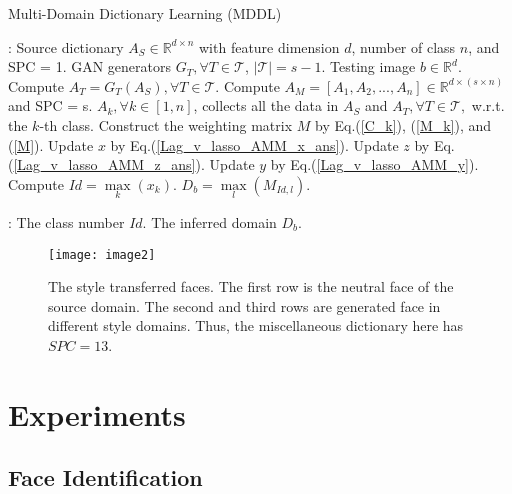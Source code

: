 \documentclass{article}
\begin{document}
\setlength{\intextsep}{10pt}
\begin{algorithm}[htb]
\caption{Multi-Domain Dictionary Learning (MDDL)}
\begin{algorithmic}[1]
    : Source dictionary $A_S\in \mathbb{R}^{d \times n}$ with feature dimension $d$, number of class $n$, and SPC = 1. GAN generators $G_T, \forall T \in \mathcal{T}$, $|\mathcal{T}|=s-1$. Testing image $b\in \mathbb{R}^{d}$.
    \STATE Compute $A_T=G_T(A_S), \forall T \in \mathcal{T}$.
    \STATE Compute $A_M = [A_1,A_2,...,A_n] \in \mathbb{R}^{d \times (s\times n)}$ and SPC = s. $A_k, \forall k \in [1,n]$, collects all the data in $A_S$ and $A_T, \forall T \in \mathcal{T},$ w.r.t. the $k$-th class. 
    \STATE Construct the weighting matrix $M$ by Eq.(\ref{C_k}), (\ref{M_k}), and (\ref{M}).
        \STATE Update $x$ by Eq.(\ref{Lag_v_lasso_AMM_x_ans}).
        \STATE Update $z$ by Eq.(\ref{Lag_v_lasso_AMM_z_ans}).
        \STATE Update $y$ by Eq.(\ref{Lag_v_lasso_AMM_y}).
    \ENDWHILE
    \STATE Compute $Id = \max \limits_{k}(x_k)$. $D_{b} = \max \limits_{l}(M_{Id,l})$.

    : The class number $Id$. The inferred domain $D_b$.
\end{algorithmic}
\end{algorithm}
\begin{figure}[!htb]
    \centerline{\texttt{[image: image2]}}
    \caption{The style transferred faces. The first row is the neutral face of the source domain. The second and third rows are generated face in different style domains. Thus, the miscellaneous dictionary here has $SPC=13$.}
    \label{ARGAN}
\end{figure}

\section{Experiments}
\label{sec:experiments}

\subsection{Face Identification}
\end{document}
